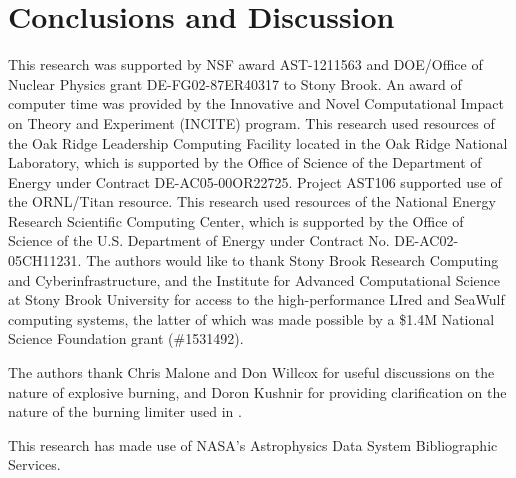 \documentclass[twocolumn,numberedappendix]{../aastex62}
\begin{document}
\section{Conclusions and Discussion}\label{Sec:Conclusions and Discussion}
\label{sec:conclusion}



\acknowledgments

This research was supported by NSF award AST-1211563 and DOE/Office of
Nuclear Physics grant DE-FG02-87ER40317 to Stony Brook. An award of
computer time was provided by the Innovative and Novel Computational
Impact on Theory and Experiment (INCITE) program.  This research used
resources of the Oak Ridge Leadership Computing Facility located in
the Oak Ridge National Laboratory, which is supported by the Office of
Science of the Department of Energy under Contract
DE-AC05-00OR22725. Project AST106 supported use of the ORNL/Titan
resource.  This research used resources of the National Energy
Research Scientific Computing Center, which is supported by the Office
of Science of the U.S. Department of Energy under Contract
No. DE-AC02-05CH11231. The authors would like to thank Stony Brook
Research Computing and Cyberinfrastructure, and the Institute for
Advanced Computational Science at Stony Brook University for access
to the high-performance LIred and SeaWulf computing systems, the latter
of which was made possible by a \$1.4M National Science Foundation grant (\#1531492).

The authors thank Chris Malone and Don Willcox for useful discussions
on the nature of explosive burning, and Doron Kushnir for providing
clarification on the nature of the burning limiter used in \cite{kushnir:2013}.

This research has made use of NASA's Astrophysics Data System 
Bibliographic Services.

\clearpage



\end{document}
